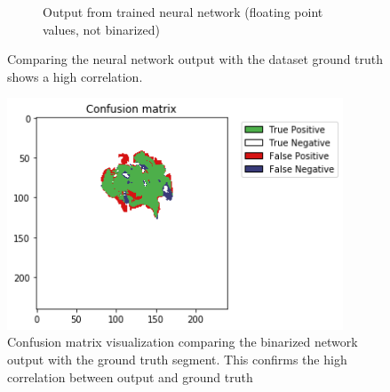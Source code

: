 \begin{figure}[H]
\begin{subfigure}[t]{.5\textwidth}
        \caption{Output from trained neural network (floating point values, not binarized)}
    \end{subfigure}
    \caption{Comparing the neural network output with the dataset ground truth shows a high correlation.}
\end{figure}


\begin{figure}[H]
\centering
\includegraphics[width=10cm]{chapters/04_segmentation/images/confusion_matrix.png}
\caption{Confusion matrix visualization comparing the binarized network output with the ground truth segment. This confirms the high correlation between output and ground truth}
\end{figure}
